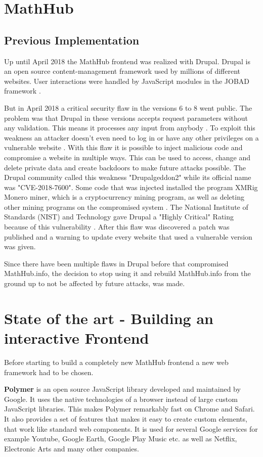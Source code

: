 \documentclass[11pt,a4paper]{article}
\begin{document}
\section{MathHub} \label{mathhub}
\subsection{Previous Implementation}
Up until April 2018 the MathHub frontend was realized with Drupal.
Drupal is an open source content-management framework used by millions of different websites.
User interactions were handled by JavaScript modules in the JOBAD framework \cite{comp}.
	
But in April 2018 a critical security flaw in the versions 6 to 8 went public.
The problem was that Drupal in these versions accepts request parameters without any validation.
This means it processes any input from anybody \cite{zdnet}.
To exploit this weakness an attacker doesn't even need to log in or have any other privileges on a vulnerable website \cite{register}.
With this flaw it is possible to inject malicious code and compromise a website in multiple ways.
This can be used to access, change and delete private data and create backdoors to make future attacks possible.
The Drupal community called this weakness "Drupalgeddon2" while its official name was "CVE-2018-7600".
Some code that was injected installed the program XMRig Monero miner, which is a cryptocurrency mining program, as well as deleting other mining programs on the compromised system \cite{hacker}.
The National Institute of Standards (NIST) and Technology gave Drupal a "Highly Critical" Rating because of this vulnerability \cite{nist}.
 After this flaw was discovered a patch was published and a warning to update every website that used a vulnerable version was given.
	
Since there have been multiple flaws in Drupal before that compromised MathHub.info, the decision to stop using it and rebuild MathHub.info from the ground up to not be affected by future attacks, was made. 

\section{State of the art - Building an interactive Frontend} \label{SoA}
Before starting to build a completely new MathHub frontend a new web framework had to be chosen.

\textbf{Polymer} \cite{polymer} is an open source JavaScript library developed and maintained by Google.
It uses the native technologies of a browser instead of large custom JavaScript libraries.
This makes Polymer remarkably fast on Chrome and Safari.
It also provides a set of features that makes it easy to create custom elements, that work like standard web components.
It is used for several Google services for example Youtube, Google Earth, Google Play Music etc. as well as Netflix, Electronic Arts and many other companies. 
\end{document}
